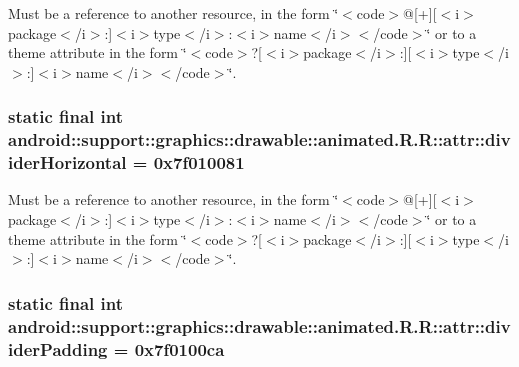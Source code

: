 Must be a reference to another resource, in the form \char`\"{}$<$code$>$@\mbox{[}+\mbox{]}\mbox{[}$<$i$>$package$<$/i$>$:\mbox{]}$<$i$>$type$<$/i$>$:$<$i$>$name$<$/i$>$$<$/code$>$\char`\"{} or to a theme attribute in the form \char`\"{}$<$code$>$?\mbox{[}$<$i$>$package$<$/i$>$:\mbox{]}\mbox{[}$<$i$>$type$<$/i$>$:\mbox{]}$<$i$>$name$<$/i$>$$<$/code$>$\char`\"{}. \hypertarget{classandroid_1_1support_1_1graphics_1_1drawable_1_1animated_1_1_r_1_1attr_6ae12989319b5ab31a96a31b005ee7fe}{
\subsubsection[{dividerHorizontal}]{\setlength{\rightskip}{0pt plus 5cm}static final int android::support::graphics::drawable::animated.R.R::attr::dividerHorizontal = 0x7f010081}}
\label{classandroid_1_1support_1_1graphics_1_1drawable_1_1animated_1_1_r_1_1attr_6ae12989319b5ab31a96a31b005ee7fe}


Must be a reference to another resource, in the form \char`\"{}$<$code$>$@\mbox{[}+\mbox{]}\mbox{[}$<$i$>$package$<$/i$>$:\mbox{]}$<$i$>$type$<$/i$>$:$<$i$>$name$<$/i$>$$<$/code$>$\char`\"{} or to a theme attribute in the form \char`\"{}$<$code$>$?\mbox{[}$<$i$>$package$<$/i$>$:\mbox{]}\mbox{[}$<$i$>$type$<$/i$>$:\mbox{]}$<$i$>$name$<$/i$>$$<$/code$>$\char`\"{}. \hypertarget{classandroid_1_1support_1_1graphics_1_1drawable_1_1animated_1_1_r_1_1attr_b8fddf27c9622646132caa52094cdb87}{
\subsubsection[{dividerPadding}]{\setlength{\rightskip}{0pt plus 5cm}static final int android::support::graphics::drawable::animated.R.R::attr::dividerPadding = 0x7f0100ca}}
\label{classandroid_1_1support_1_1graphics_1_1drawable_1_1animated_1_1_r_1_1attr_b8fddf27c9622646132caa52094cdb87}


